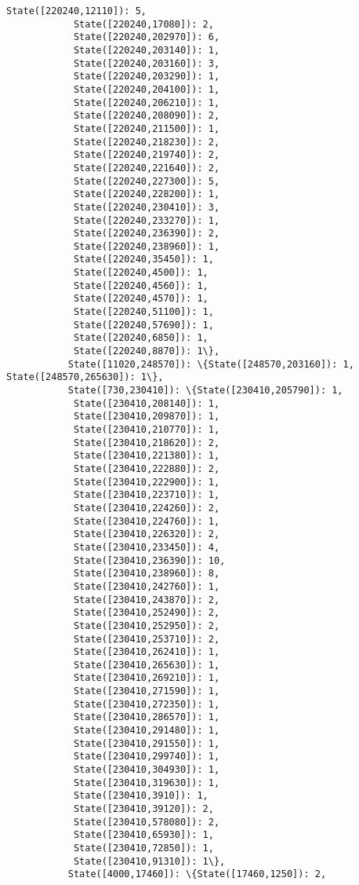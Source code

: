 \documentclass[11pt]{article}
\begin{document}
\begin{Verbatim}[commandchars=\\\{\}]
            State([220240,12110]): 5,
            State([220240,17080]): 2,
            State([220240,202970]): 6,
            State([220240,203140]): 1,
            State([220240,203160]): 3,
            State([220240,203290]): 1,
            State([220240,204100]): 1,
            State([220240,206210]): 1,
            State([220240,208090]): 2,
            State([220240,211500]): 1,
            State([220240,218230]): 2,
            State([220240,219740]): 2,
            State([220240,221640]): 2,
            State([220240,227300]): 5,
            State([220240,228200]): 1,
            State([220240,230410]): 3,
            State([220240,233270]): 1,
            State([220240,236390]): 2,
            State([220240,238960]): 1,
            State([220240,35450]): 1,
            State([220240,4500]): 1,
            State([220240,4560]): 1,
            State([220240,4570]): 1,
            State([220240,51100]): 1,
            State([220240,57690]): 1,
            State([220240,6850]): 1,
            State([220240,8870]): 1\},
           State([11020,248570]): \{State([248570,203160]): 1, State([248570,265630]): 1\},
           State([730,230410]): \{State([230410,205790]): 1,
            State([230410,208140]): 1,
            State([230410,209870]): 1,
            State([230410,210770]): 1,
            State([230410,218620]): 2,
            State([230410,221380]): 1,
            State([230410,222880]): 2,
            State([230410,222900]): 1,
            State([230410,223710]): 1,
            State([230410,224260]): 2,
            State([230410,224760]): 1,
            State([230410,226320]): 2,
            State([230410,233450]): 4,
            State([230410,236390]): 10,
            State([230410,238960]): 8,
            State([230410,242760]): 1,
            State([230410,243870]): 2,
            State([230410,252490]): 2,
            State([230410,252950]): 2,
            State([230410,253710]): 2,
            State([230410,262410]): 1,
            State([230410,265630]): 1,
            State([230410,269210]): 1,
            State([230410,271590]): 1,
            State([230410,272350]): 1,
            State([230410,286570]): 1,
            State([230410,291480]): 1,
            State([230410,291550]): 1,
            State([230410,299740]): 1,
            State([230410,304930]): 1,
            State([230410,319630]): 1,
            State([230410,3910]): 1,
            State([230410,39120]): 2,
            State([230410,578080]): 2,
            State([230410,65930]): 1,
            State([230410,72850]): 1,
            State([230410,91310]): 1\},
           State([4000,17460]): \{State([17460,1250]): 2,

\end{Verbatim}
\end{document}

